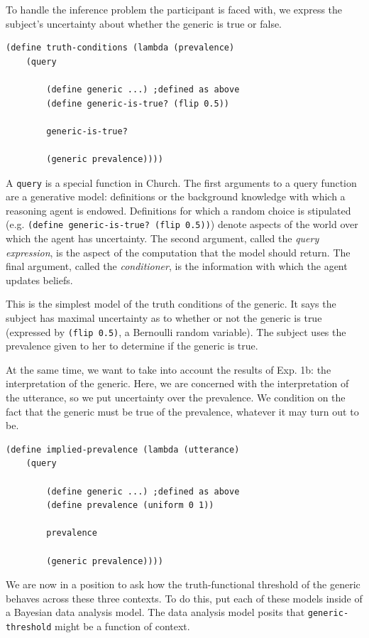 \documentclass[10pt,letterpaper]{article}
\begin{document}
To handle the inference problem the participant is faced with, we express the subject's uncertainty about whether the generic is true or false.

 \begin{lstlisting}
(define truth-conditions (lambda (prevalence)
	(query  
	
		(define generic ...) ;defined as above
		(define generic-is-true? (flip 0.5))
		
		generic-is-true?
			
		(generic prevalence))))
\end{lstlisting}

A \lstinline{query} is a special function in Church. The first arguments to a query function are a generative model: definitions or the background knowledge with which a reasoning agent is endowed. Definitions for which a random choice is stipulated (e.g. \lstinline{(define generic-is-true? (flip 0.5))}) denote aspects of the world over which the agent has uncertainty. The second argument, called the \emph{query expression}, is the aspect of the computation that the model should return. The final argument, called the \emph{conditioner}, is the information with which the agent updates beliefs. 

This is the simplest model of the truth conditions of the generic. It says the subject has maximal uncertainty as to whether or not the generic is true (expressed by \lstinline{(flip 0.5)}, a Bernoulli random variable). The subject uses the prevalence given to her to determine if the generic is true. 

At the same time, we want to take into account the results of Exp. 1b: the interpretation of the generic. Here, we are concerned with the interpretation of the utterance, so we put uncertainty over the prevalence. We condition on the fact that the generic must be true of the prevalence, whatever it may turn out to be.

 \begin{lstlisting}
(define implied-prevalence (lambda (utterance)
	(query  
		
		(define generic ...) ;defined as above
		(define prevalence (uniform 0 1))
		
		prevalence
			
		(generic prevalence))))
\end{lstlisting}

We are now in a position to ask how the truth-functional threshold of the generic behaves across these three contexts. To do this, put each of these models inside of a Bayesian data analysis model. The data analysis model posits that \lstinline{generic-threshold} might be a function of context.
\end{document}
